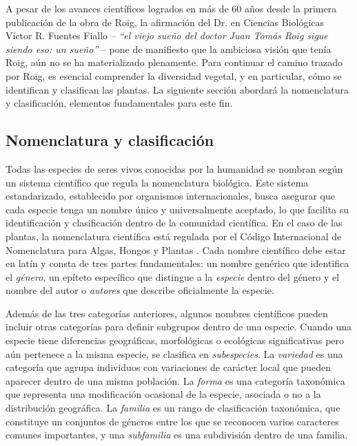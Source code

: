 A pesar de los avances científicos logrados en más de 60 años desde la primera publicación 
de la obra de Roig, la afirmación del Dr. en Ciencias Biológicas Víctor R. Fuentes Fiallo 
-- \textit{``el viejo sueño del doctor Juan Tomás Roig sigue siendo eso: un sueño''} -- \cite{Fiallo2009} 
pone de manifiesto que la ambiciosa visión que tenía Roig, aún no se ha materializado plenamente. Para continuar el camino 
trazado por Roig, es esencial comprender la diversidad vegetal, 
y en particular, cómo se identifican y clasifican las plantas. La siguiente sección abordará la nomenclatura y clasificación, 
elementos fundamentales para este fin. 


\subsection{Nomenclatura y clasificación}
Todas las especies de seres vivos conocidas por la humanidad se nombran según un 
sistema científico que regula la nomenclatura biológica. Este sistema estandarizado, 
establecido por organismos internacionales, busca asegurar que cada especie tenga 
un nombre único y universalmente aceptado, lo que facilita su identificación y 
clasificación dentro de la comunidad científica. En el caso de las plantas, 
la nomenclatura científica está regulada por el Código Internacional de Nomenclatura 
para Algas, Hongos y Plantas \cite{Mcneil2012}. Cada nombre científico debe estar en latín 
y consta de tres partes fundamentales: un nombre genérico que identifica el \textit{género}, 
un epíteto específico que distingue a la \textit{especie} dentro del género y el 
nombre del autor o \textit{autores} que describe oficialmente la especie.

Además de las tres categorías anteriores, algunos nombres científicos pueden incluir 
otras categorías para definir subgrupos dentro de una especie. Cuando una especie 
tiene diferencias geográficas, morfológicas o ecológicas significativas pero aún 
pertenece a la misma especie, se clasifica en \textit{subespecies}. 
La \textit{variedad} es una categoría que agrupa individuos con variaciones de 
carácter local que pueden aparecer dentro de una misma población. 
La \textit{forma} es una categoría taxonómica que representa una 
modificación ocasional de la especie, asociada o no a la distribución geográfica.
La \textit{familia} es un rango de clasificación taxonómica, que constituye un conjuntos 
de géneros entre los que se reconocen varios caracteres comunes importantes, 
y una \textit{subfamilia} es una subdivisión dentro de una familia. \cite{Romero2017}

